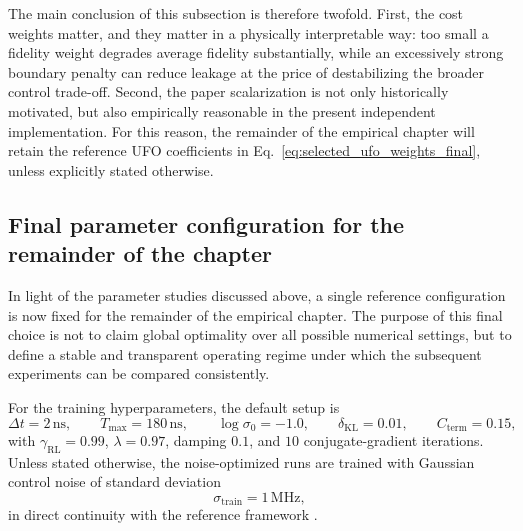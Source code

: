 The main conclusion of this subsection is therefore twofold. First, the cost weights matter, and they matter in a physically interpretable way: too small a fidelity weight degrades average fidelity substantially, while an excessively strong boundary penalty can reduce leakage at the price of destabilizing the broader control trade-off. Second, the paper scalarization is not only historically motivated, but also empirically reasonable in the present independent implementation. For this reason, the remainder of the empirical chapter will retain the reference UFO coefficients in Eq.~\eqref{eq:selected_ufo_weights_final}, unless explicitly stated otherwise.


\subsection{Final parameter configuration for the remainder of the chapter}
\label{subsec:final_parameter_configuration}

In light of the parameter studies discussed above, a single reference configuration is now fixed for the remainder of the empirical chapter. The purpose of this final choice is not to claim global optimality over all possible numerical settings, but to define a stable and transparent operating regime under which the subsequent experiments can be compared consistently.

For the training hyperparameters, the default setup is
\begin{equation}
\Delta t = 2\,\mathrm{ns},
\qquad
T_{\max}=180\,\mathrm{ns},
\qquad
\log \sigma_0 = -1.0,
\qquad
\delta_{\mathrm{KL}} = 0.01,
\qquad
C_{\mathrm{term}}=0.15,
\label{eq:final_training_setup}
\end{equation}
with \(\gamma_{\mathrm{RL}}=0.99\), \(\lambda=0.97\), damping \(0.1\), and \(10\) conjugate-gradient iterations. Unless stated otherwise, the noise-optimized runs are trained with Gaussian control noise of standard deviation
\begin{equation}
\sigma_{\mathrm{train}} = 1\,\mathrm{MHz},
\label{eq:final_training_noise}
\end{equation}
in direct continuity with the reference framework \cite{Niu2019}.



